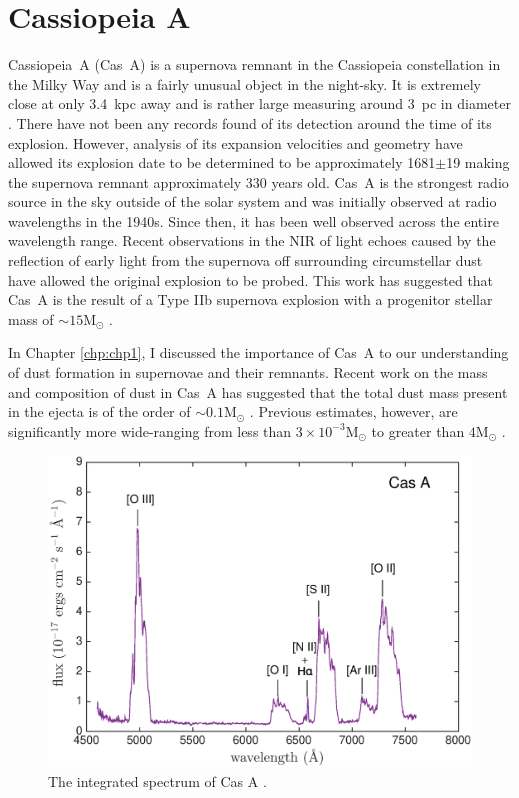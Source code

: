 \section{Cassiopeia A}
\label{CasA_intro}

Cassiopeia~A (Cas~A) is a supernova remnant in the Cassiopeia constellation in the Milky Way and is a fairly unusual object in the night-sky.  It is extremely close at only 3.4~kpc away and  is rather large measuring around 3~pc in diameter \citep{Reed1995}.  There have not been any records found of its detection around the time of its explosion.  However, analysis of its expansion velocities and geometry have allowed its explosion date to be determined to be approximately 1681$\pm$19 \citep{Fesen2006} making the supernova remnant approximately 330 years old.  Cas~A is the strongest radio source in the sky outside of the solar system and was initially observed at radio wavelengths in the 1940s.  Since then, it has been well observed across the entire wavelength range.  Recent observations in the NIR of light echoes caused by the reflection of early light from the supernova off surrounding circumstellar dust have allowed the original explosion to be probed.  This work has suggested that Cas~A is the result of a Type IIb supernova explosion with a progenitor stellar mass of $\sim15$M$_{\odot}$ \citep{Krause2008}.

In Chapter \ref{chp:chp1}, I discussed the importance of Cas~A to our understanding of dust formation in supernovae and their remnants.  Recent work on the mass and composition of dust in Cas~A has suggested that the total dust mass present in the ejecta is of the order of $\sim0.1$M$_{\odot}$ \citep{Barlow2010,Nozawa2010,Arendt2014}.  Previous estimates, however, are significantly more wide-ranging from less than $3\times10^{-3}$M$_{\odot}$ to greater than $4$M$_{\odot}$ \citep{Milisavljevic2012}.  


\begin{figure}
\centering
\includegraphics[clip=true,scale=0.6, trim=30 0 50 20]{chapters/chapter6/figs/CasA/spectrum}
\caption{The integrated spectrum of Cas A \citep{Milisavljevic2013}.}
\label{CasA_spectrum}
\end{figure}

